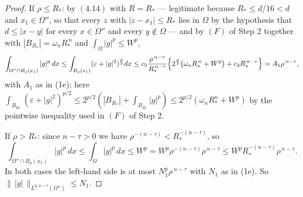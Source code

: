 \begin{proof}
If $\rho\le R_\ast$: by $(4.14)$ with $R=R_\ast$ --- legitimate because
$R_\ast\le d/16<d$ and $x_1\in\Omega''$, so that every $z$ with
$|z-x_1|\le R_\ast$ lies in $\Omega$ by the hypothesis that
$d\le|x-y|$ for every $x\in\Omega''$ and every $y\notin\Omega$ ---
and by $(F)$ of Step 2 together with
$|B_{R_\ast}|=\omega_nR_\ast^{\,n}$ and $\int_\Omega|g|^p\le W^p$,
\[
\int_{\Omega''\cap B_\rho(x_1)}|g|^p\,dx
\le\int_{B_\rho(x_1)}(\varepsilon+|g|^2)^{\frac p2}dx
\le c_5\frac{\rho^{\,n-\tau}}{R_\ast^{\,n-\tau}}
\Bigl\{2^{\frac p2}\bigl(\omega_nR_\ast^{\,n}+W^p\bigr)+c_4R_\ast^{\,n-\tau}\Bigr\}
=A_1\rho^{\,n-\tau},
\]
with $A_1$ as in (1e); here
$\int_{B_{R_\ast}}(\varepsilon+|g|^2)^{p/2}\le2^{p/2}(|B_{R_\ast}|+\int_{B_{R_\ast}}|g|^p)
\le2^{p/2}(\omega_nR_\ast^n+W^p)$ by the pointwise inequality used in $(F)$ of Step 2.

If $\rho>R_\ast$: since $n-\tau>0$ we have
$\rho^{-(n-\tau)}<R_\ast^{-(n-\tau)}$, so
\[
\int_{\Omega''\cap B_\rho(x_1)}|g|^p\,dx\le\int_\Omega|g|^p\,dx\le W^p
=W^p\rho^{-(n-\tau)}\rho^{\,n-\tau}\le W^pR_\ast^{-(n-\tau)}\rho^{\,n-\tau}.
\]
In both cases the left-hand side is at most $N_1^p\rho^{\,n-\tau}$ with $N_1$ as
in (1e).  So $\|\,|g|\,\|_{L^{p,n-\tau}(\Omega'')}\le N_1$.

\end{proof}
